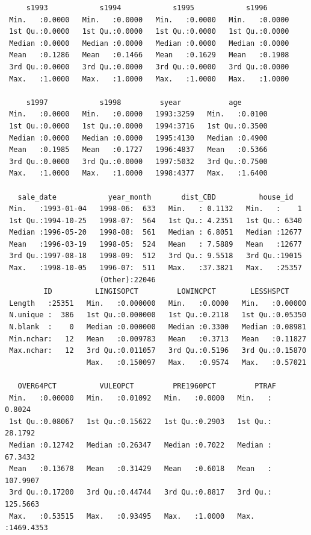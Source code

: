 \documentclass[
  norsk,
  a4paper,
]{article}
\begin{document}
\begin{verbatim}
     s1993            s1994            s1995            s1996       
 Min.   :0.0000   Min.   :0.0000   Min.   :0.0000   Min.   :0.0000  
 1st Qu.:0.0000   1st Qu.:0.0000   1st Qu.:0.0000   1st Qu.:0.0000  
 Median :0.0000   Median :0.0000   Median :0.0000   Median :0.0000  
 Mean   :0.1286   Mean   :0.1466   Mean   :0.1629   Mean   :0.1908  
 3rd Qu.:0.0000   3rd Qu.:0.0000   3rd Qu.:0.0000   3rd Qu.:0.0000  
 Max.   :1.0000   Max.   :1.0000   Max.   :1.0000   Max.   :1.0000  
                                                                    
     s1997            s1998         syear           age        
 Min.   :0.0000   Min.   :0.0000   1993:3259   Min.   :0.0100  
 1st Qu.:0.0000   1st Qu.:0.0000   1994:3716   1st Qu.:0.3500  
 Median :0.0000   Median :0.0000   1995:4130   Median :0.4900  
 Mean   :0.1985   Mean   :0.1727   1996:4837   Mean   :0.5366  
 3rd Qu.:0.0000   3rd Qu.:0.0000   1997:5032   3rd Qu.:0.7500  
 Max.   :1.0000   Max.   :1.0000   1998:4377   Max.   :1.6400  
                                                               
   sale_date            year_month       dist_CBD          house_id    
 Min.   :1993-01-04   1998-06:  633   Min.   : 0.1132   Min.   :    1  
 1st Qu.:1994-10-25   1998-07:  564   1st Qu.: 4.2351   1st Qu.: 6340  
 Median :1996-05-20   1998-08:  561   Median : 6.8051   Median :12677  
 Mean   :1996-03-19   1998-05:  524   Mean   : 7.5889   Mean   :12677  
 3rd Qu.:1997-08-18   1998-09:  512   3rd Qu.: 9.5518   3rd Qu.:19015  
 Max.   :1998-10-05   1996-07:  511   Max.   :37.3821   Max.   :25357  
                      (Other):22046                                    
         ID          LINGISOPCT         LOWINCPCT        LESSHSPCT      
 Length   :25351   Min.   :0.000000   Min.   :0.0000   Min.   :0.00000  
 N.unique :  386   1st Qu.:0.000000   1st Qu.:0.2118   1st Qu.:0.05350  
 N.blank  :    0   Median :0.000000   Median :0.3300   Median :0.08981  
 Min.nchar:   12   Mean   :0.009783   Mean   :0.3713   Mean   :0.11827  
 Max.nchar:   12   3rd Qu.:0.011057   3rd Qu.:0.5196   3rd Qu.:0.15870  
                   Max.   :0.150097   Max.   :0.9574   Max.   :0.57021  
                                                                        
   OVER64PCT          VULEOPCT         PRE1960PCT         PTRAF          
 Min.   :0.00000   Min.   :0.01092   Min.   :0.0000   Min.   :   0.8024  
 1st Qu.:0.08067   1st Qu.:0.15622   1st Qu.:0.2903   1st Qu.:  28.1792  
 Median :0.12742   Median :0.26347   Median :0.7022   Median :  67.3432  
 Mean   :0.13678   Mean   :0.31429   Mean   :0.6018   Mean   : 107.9907  
 3rd Qu.:0.17200   3rd Qu.:0.44744   3rd Qu.:0.8817   3rd Qu.: 125.5663  
 Max.   :0.53515   Max.   :0.93495   Max.   :1.0000   Max.   :1469.4353  
                                                                         

\end{verbatim}
\end{document}

